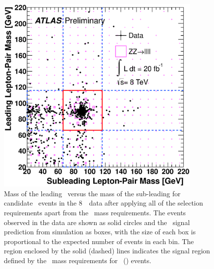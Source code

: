  \begin{figure}[htbp]
 \begin{center}
  \includegraphics[width=0.9\textwidth]{8TeV/h_mz1_mz2}\hfill
  \caption[Mass of the leading \leppair\ versus the mass of the
  sub-leading \leppair\ for candidate \ZZ\ events in the 8~\tev\ data.]
  {\small Mass of the leading \leppair\ versus the mass of the
  sub-leading \leppair for candidate \ZZ\ events in the 8~\tev\ data after
  applying all of the selection
  requirements apart from the \dilepton\ mass requirements.
  The events observed in the data are shown as solid circles and the \ZZsllll\
  signal prediction from simulation as boxes, with 
  the size of each box is proportional to the expected number of events in each bin.  
  The region enclosed by the solid (dashed) lines indicates the signal region defined by the
  \dilepton\ mass requirements for \ZZ\ (\ZZs) events.
   }
    \label{fig:zzdists-Zmass2D-eight}
 \end{center}
 \end{figure}

